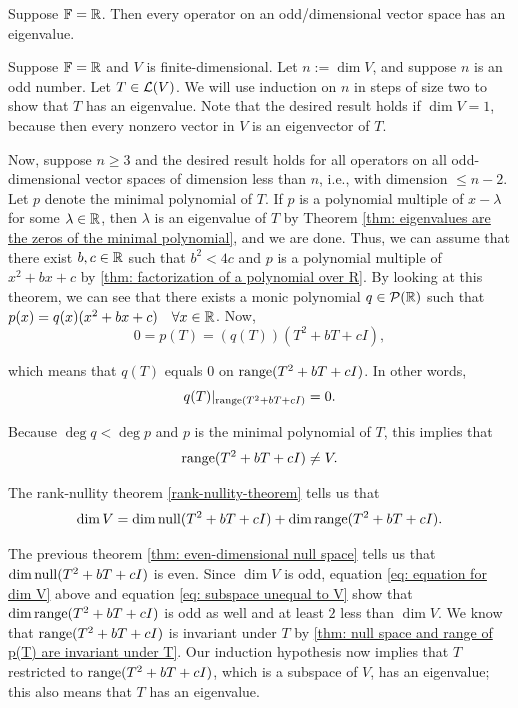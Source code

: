 \begin{thm}
  Suppose $\mathbb{F} = \mathbb{R}$. Then every operator on an odd\-/dimensional vector space has an eigenvalue.
\end{thm}
\begin{prf}
  Suppose $\mathbb{F} = \mathbb{R}$ and $V$ is finite-dimensional. Let $n := \dim V$, and suppose $n$ is an odd number. Let $T \in \mathcal{L}(V)$. We will use induction on $n$ in steps of size two to show that $T$ has an eigenvalue. Note that the desired result holds if $\dim V = 1$, because then every nonzero vector in $V$ is an eigenvector of $T$.

  Now, suppose $n \geq 3$ and the desired result holds for all operators on all odd-dimensional vector spaces of dimension less than $n$, i.e., with dimension $\leq n-2$. Let $p$ denote the minimal polynomial of $T$. If $p$ is a polynomial multiple of $x-\lambda$ for some $\lambda \in \mathbb{R}$, then $\lambda$ is an eigenvalue of $T$ by Theorem \ref{thm: eigenvalues are the zeros of the minimal polynomial}, and we are done. Thus, we can assume that there exist $b, c \in \mathbb{R}$ such that $b^2 < 4c$ and $p$ is a polynomial multiple of $x^2 + bx + c$ by \ref{thm: factorization of a polynomial over R}. By looking at this theorem, we can see that there exists a monic polynomial $q \in \mathcal{P}(\mathbb{R})$ such that $p(x) = q(x)(x^2 + bx + c) \quad \forall x \in \mathbb{R}$. Now,
  \begin{equation}
    0 = p(T) = (q(T)) (T^2 + bT + cI),
  \end{equation}

  which means that $q(T)$ equals $0$ on $\operatorname{range}(T^2 + bT + cI)$. In other words,
  \begin{equation}
    q(T)|_{\operatorname{range}(T^2 + bT + cI)} = 0.
  \end{equation}

  Because $\deg q < \deg p$ and $p$ is the minimal polynomial of $T$, this implies that
  \begin{equation}
    \label{eq: subspace unequal to V}
    \operatorname{range} (T^2 + bT + cI) \neq V.
  \end{equation}

  The rank-nullity theorem \ref{rank-nullity-theorem} tells us that
  \begin{equation}
    \label{eq: equation for dim V}
    \dim V = \dim \operatorname{null} (T^2 + bT + cI) + \dim \operatorname{range}(T^2 + bT + cI).
  \end{equation}

  The previous theorem \ref{thm: even-dimensional null space} tells us that $\dim \operatorname{null} (T^2 + bT + cI)$ is even. Since $\dim V$ is odd, equation \eqref{eq: equation for dim V} above and equation \eqref{eq: subspace unequal to V} show that $\dim \operatorname{range}(T^2 + bT + cI)$ is odd as well and at least $2$ less than $\dim V$. We know that $\operatorname{range}(T^2 + bT + cI)$ is invariant under $T$ by \ref{thm: null space and range of p(T) are invariant under T}. Our induction hypothesis now implies that $T$ restricted to $\operatorname{range}(T^2 + bT + cI)$, which is a subspace of $V$, has an eigenvalue; this also means that $T$ has an eigenvalue.
\end{prf}